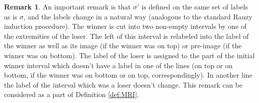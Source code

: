 \documentclass[12pt]{article}
\theoremstyle{definition}
\newtheorem*{remark}{Remark}
\begin{document}
\begin{remark}
An important remark is that $\sigma'$ is defined on the same set of labels as is $\sigma$, and the labels change in a natural way (analogous to the standard Rauzy induction procedure). The winner is cut into two non-empty intervals by one of the extremities of the loser. The left of this interval is relabeled into the label of the winner as well as its image (if the winner was on top) or pre-image (if the winner was on bottom). The label of the loser is assigned to the part of the initial winner interval which doesn't have a label in one of the lines (on top or on bottom, if the winner was on bottom or on top, correspondingly). In another line the label of the interval which was a loser doesn't change. This remark can be considered as a part of Definition \ref{def:MRI}.
\end{remark}
\end{document}
